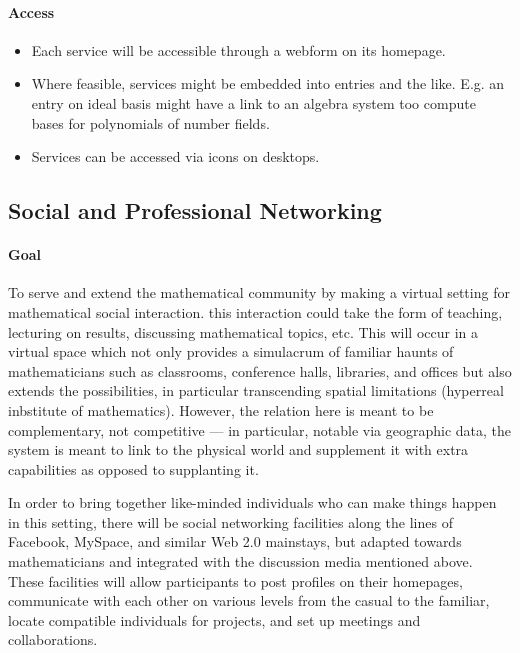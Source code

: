 \begin{itemize}
\paragraph{Access}

\begin{itemize}
\item
  Each service will be accessible through a webform on its homepage.
\item
  Where feasible, services might be embedded into entries and the like.
  E.g. an entry on ideal basis might have a link to an algebra system
  too compute bases for polynomials of number fields.
\item
  Services can be accessed via icons on desktops.
\end{itemize}

\subsection{Social and Professional Networking}

\paragraph{Goal} To serve and extend the mathematical community by making a virtual
setting for mathematical social interaction. this interaction could take
the form of teaching, lecturing on results, discussing mathematical
topics, etc. This will occur in a virtual space which not only provides
a simulacrum of familiar haunts of mathematicians such as classrooms,
conference halls, libraries, and offices but also extends the
possibilities, in particular transcending spatial limitations (hyperreal
inbstitute of mathematics). However, the relation here is meant to be
complementary, not competitive --- in particular, notable via geographic
data, the system is meant to link to the physical world and supplement
it with extra capabilities as opposed to supplanting it.

In order to bring together like-minded individuals who can make things
happen in this setting, there will be social networking facilities along
the lines of Facebook, MySpace, and similar Web 2.0 mainstays, but
adapted towards mathematicians and integrated with the discussion media
mentioned above. These facilities will allow participants to post
profiles on their homepages, communicate with each other on various
levels from the casual to the familiar, locate compatible individuals
for projects, and set up meetings and collaborations.


\end{itemize}
